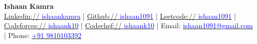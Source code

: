 \documentclass[letterpaper,10.8pt]{article}
\begin{document}

\begin{center}
  {\LARGE \textbf{Ishaan Kamra}}\\[0.5em]

  \href{https://www.linkedin.com/in/ishaankamra/}{Linkedin:// \textcolor{blue}{ishaankamra}} \quad | \quad
  \href{https://github.com/ishaan1091}{Github:// \textcolor{blue}{ishaan1091}} \quad | \quad
  \href{https://leetcode.com/ishaan1091/}{Leetcode:// \textcolor{blue}{ishaan1091}} \quad | \quad
  \href{https://codeforces.com/profile/ishaank10}{Codeforces:// \textcolor{blue}{ishaank10}} \quad | \quad
  \href{https://www.codechef.com/users/ishaank10}{Codechef:// \textcolor{blue}{ishaank10}} \quad | \quad
  Email: \href{mailto:ishaan1091@gmail.com}{\textcolor{blue}{ishaan1091@gmail.com}} \quad | \quad
  Phone: \href{tel:+919810103392}{\textcolor{blue}{+91 9810103392}}
\end{center}




\end{document}
